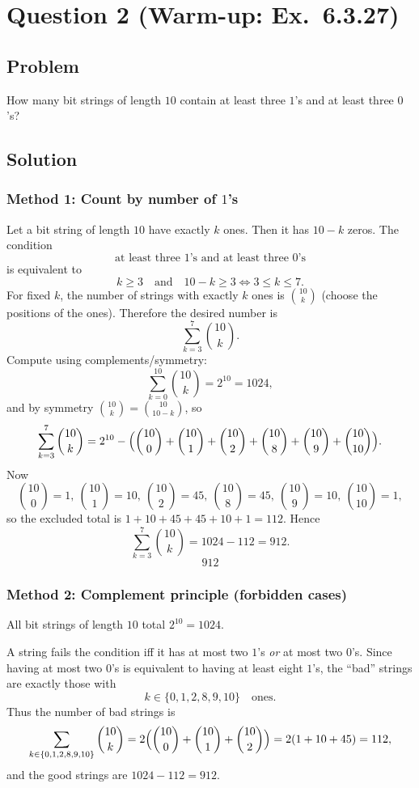 \documentclass[12pt]{article}
\begin{document}
\newpage

\section{Question 2 (Warm-up: Ex.\ 6.3.27)}
\subsection{Problem}
How many bit strings of length $10$ contain at least three $1$'s and at least three $0$'s?

\subsection{Solution}

\subsubsection{Method 1: Count by number of $1$'s}
Let a bit string of length $10$ have exactly $k$ ones. Then it has $10-k$ zeros. The condition
\[
\text{at least three $1$'s and at least three $0$'s}
\]
is equivalent to
\[
k\ge 3 \quad\text{and}\quad 10-k\ge 3 \iff 3\le k\le 7.
\]
For fixed $k$, the number of strings with exactly $k$ ones is $\binom{10}{k}$ (choose the positions of the ones). Therefore the desired number is
\[
\sum_{k=3}^{7} \binom{10}{k}.
\]
Compute using complements/symmetry:
\[
\sum_{k=0}^{10}\binom{10}{k}=2^{10}=1024,
\]
and by symmetry $\binom{10}{k}=\binom{10}{10-k}$, so
\[
\sum_{k=3}^{7}\binom{10}{k}
=2^{10}-\Bigl(\binom{10}{0}+\binom{10}{1}+\binom{10}{2}+\binom{10}{8}+\binom{10}{9}+\binom{10}{10}\Bigr).
\]
Now
\[
\binom{10}{0}=1,\ \binom{10}{1}=10,\ \binom{10}{2}=45,\ \binom{10}{8}=45,\ \binom{10}{9}=10,\ \binom{10}{10}=1,
\]
so the excluded total is $1+10+45+45+10+1=112$. Hence
\[
\sum_{k=3}^{7}\binom{10}{k}=1024-112=912.
\]
\[
\boxed{912}
\]

\subsubsection{Method 2: Complement principle (forbidden cases)}
All bit strings of length $10$ total $2^{10}=1024$.

A string fails the condition iff it has at most two $1$'s \emph{or} at most two $0$'s. Since having at most two $0$'s is equivalent to having at least eight $1$'s, the ``bad'' strings are exactly those with
\[
k\in\{0,1,2,8,9,10\}\quad\text{ones}.
\]
Thus the number of bad strings is
\[
\sum_{k\in\{0,1,2,8,9,10\}} \binom{10}{k}
=2\Bigl(\binom{10}{0}+\binom{10}{1}+\binom{10}{2}\Bigr)
=2(1+10+45)=112,
\]
and the good strings are $1024-112=912$.
\end{document}
